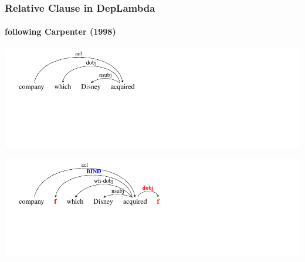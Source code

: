 \documentclass[mathserif,12pt]{beamer}
\newcommand \ignore[1]{}
\newcommand{\hlight}[1]{{\color{blue!80} #1}}
\newcommand{\bind}{\textsc{bind}}
\begin{document}
\begin{frame}[noframenumbering]
\frametitle{Relative Clause in DepLambda}
\framesubtitle{following Carpenter (1998)}
\begin{center}
\includegraphics[trim=1em 7.5em 22em 0em,clip=true,scale=1]{figures/relative-object-extraction-ud}

\vspace{3em}

\includegraphics[trim=1em 6.5em 17em 0em,clip=true,scale=1]{figures/relative-object-extraction-binding-ud}

\ignore{
\begin{small}
\begin{tabular}{l}\\
  $\mathrm{(acl}$ \hspace{0.3cm}  $\mathrm{company}$ \\ 
  \hspace*{1cm} ($\hlight{\bind}$ $\alert{f}$ \\
  \hspace*{2cm}  $\mathrm{(wh}$-$\mathrm{dobj}$  \\  
  \hspace*{3cm} $\mathrm{(nsubj}$ \\
  \hspace*{4cm} $\mathrm{(dobj~acquired}$~$f)$\\
  \hspace*{3cm}$\mathrm{~Disney))}$ \\
  \hspace*{2cm} $\mathrm{which)))}$
\end{tabular}
\end{small}
}
\end{center}
\end{frame}
\end{document}
